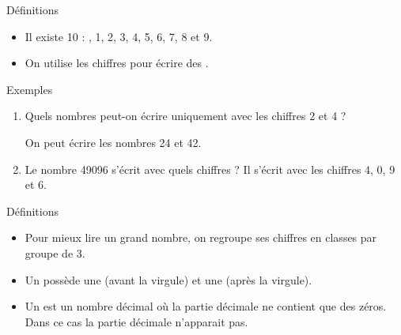 \documentclass[xcolor={dvipsnames}]{beamer}
\begin{document}
\begin{frame}
	\begin{alertblock}{Définitions}
		\begin{itemize}\pause
			\item Il existe 10  : , 1, 2, 3, 4, 5, 6, 7, 8 et 9.\pause
			
			\item On utilise les chiffres pour \pause écrire des .\pause	
		
		\end{itemize}
	\end{alertblock}

	\begin{exampleblock}{Exemples}
		\begin{enumerate}
			\item Quels nombres peut-on écrire uniquement avec les chiffres  2 et 4 ?\pause
			
			On peut écrire les nombres 24 et 42. \pause
			\item Le nombre \num{49096} s'écrit avec quels chiffres ? \pause 
			Il s'écrit avec les chiffres 4, 0, 9 et 6.
			
		\end{enumerate}
	\end{exampleblock}

	
\end{frame}



\begin{frame}
	\begin{alertblock}{Définitions}
		\begin{itemize}\pause
			\item Pour mieux lire un grand nombre, on regroupe \pause ses chiffres en classes par groupe de 3.\pause
			
			\item Un  possède \pause une  (avant la virgule) et une  (après la virgule).\pause
			
			\item Un  est un nombre décimal où \pause  la partie décimale ne contient que des zéros. Dans ce cas la partie décimale n'apparait pas.	
			
		\end{itemize}
	\end{alertblock}	
	
\end{frame}
\end{document}
